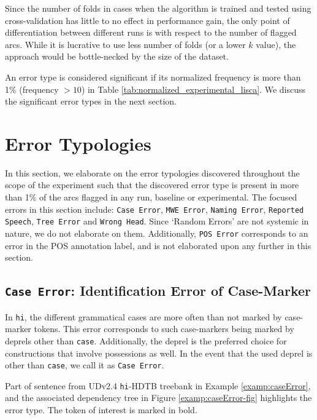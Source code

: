 Since the number of folds in cases when the algorithm is trained and tested using cross-validation has little to no effect in performance gain, the only point of differentiation between different runs is with respect to the number of flagged arcs. While it is lucrative to use less number of folds (or a lower $k$ value), the approach would be bottle-necked by the size of the dataset.

An error type is considered significant if its normalized frequency is more than 1\% (frequency $> 10$) in  Table \ref{tab:normalized_experimental_lisca}. We discuss the significant error types in the next section.

\section{Error Typologies}
\label{typologies:lisca}

In this section, we elaborate on the error typologies discovered throughout the scope of the experiment such that the discovered error type is present in more than 1\% of the arcs flagged in any run, baseline or experimental. The focused errors in this section include: \texttt{Case Error}, \texttt{MWE Error}, \texttt{Naming Error}, \texttt{Reported Speech}, \texttt{Tree Error} and \texttt{Wrong Head}. Since `Random Errors' are not systemic in nature, we do not elaborate on them. Additionally, \texttt{POS Error} corresponds to an error in the POS annotation label, and is not elaborated upon any further in this section.

\subsection[Identification Error of Case-Marker: \texttt{Case Error}]{\texttt{Case Error}: Identification Error of Case-Marker}

In \texttt{hi}, the different grammatical cases are more often than not marked by case-marker tokens. This error corresponds to such case-markers being marked by deprels other than \texttt{case}. Additionally, the deprel is the preferred choice for constructions that involve possessions as well. In the event that the used deprel is other than \texttt{case}, we call it as \texttt{Case Error}.

Part of sentence from UDv2.4 \texttt{hi}-HDTB treebank in Example \ref{examp:caseError}, and the associated dependency tree in Figure \ref{examp:caseError-fig} highlights the error type. The token of interest is marked in bold.

